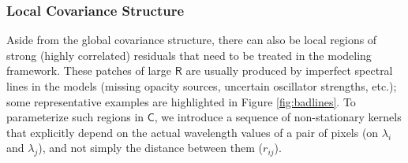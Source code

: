\documentclass[iop,floatfix]{emulateapj}
\newcommand{\vR}{\mathsf{R}}
\newcommand{\vC}{\mathsf{C}}
\begin{document}
\begin{figure}[!htb]
\begin{center}
\label{fig:matrix}
\end{center}
\end{figure}


\subsubsection{Local Covariance Structure} \label{subsec:local_covariance}

Aside from the global covariance structure, there can also be local regions of strong (highly 
correlated) residuals that need to be treated in the modeling framework.  These patches of large 
$\vR$ are usually produced by imperfect spectral lines in the models (missing opacity sources, 
uncertain oscillator strengths, etc.); some representative examples are highlighted in Figure 
\ref{fig:badlines}.  To parameterize such regions in $\vC$, we introduce a sequence of 
non-stationary kernels that explicitly depend on the actual wavelength values of a pair of pixels 
(on $\lambda_i$ and $\lambda_j$), and not simply the distance between them ($r_{ij}$).  
\end{document}
